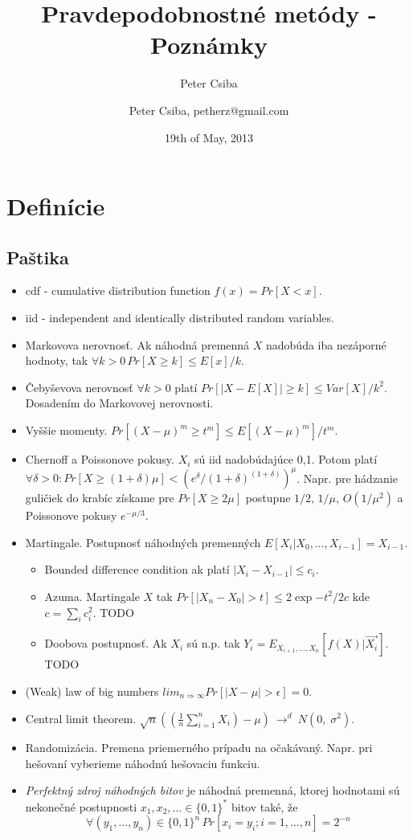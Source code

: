 \documentclass[12pt,a4paper]{article}
\author{Peter Csiba}
\title{Pravdepodobnostné metódy - Poznámky}
\date{19th of May, 2013}
\author{Peter Csiba, petherz@gmail.com}
\begin{document}
\maketitle


\section{Definície}

\subsection{Paštika} 
\begin{itemize} 
  \item cdf - cumulative distribution function $f(x) = Pr[X < x]$. 
  \item iid - independent and identically distributed random variables. 
  \item Markovova nerovnosť. Ak náhodná premenná $X$ nadobúda iba nezáporné hodnoty, tak $\forall k > 0 \, Pr[X \geq k] \leq E[x]/k$.
  \item Čebyševova nerovnosť $\forall k>0$ platí $Pr[|X-E[X]| \geq k] \leq Var[X]/k^2$. Dosadením do Markovovej nerovnosti. 
  \item Vyššie momenty. $Pr[(X-\mu)^m \geq t^m] \leq E[(X - \mu)^m]/t^m$. 
  \item Chernoff a Poissonove pokusy. $X_i$ sú iid nadobúdajúce 0,1. Potom platí $\forall \delta > 0 : Pr[X \geq (1 + \delta)\mu] < (e^\delta/(1 + \delta)^{(1+\delta)})^\mu$. Napr. pre hádzanie guličiek do krabíc získame pre $Pr[X \geq 2\mu]$ postupne $1/2$, $1/\mu$, $O(1/\mu^2)$ a Poissonove pokusy $e^{-\mu/3}$.
  \item Martingale. Postupnosť náhodných premenných $E[X_i | X_0, \ldots, X_{i-1}] = X_{i-1}$.
    \begin{itemize} 
      \item Bounded difference condition ak platí $|X_i - X_{i-1}| \leq c_i$.
      \item Azuma. Martingale $X$ tak $Pr[|X_n - X_0| > t] \leq 2 \exp{-t^2 / 2c}$ kde $c=\sum_i c_i^2$. TODO 
      \item Doobova postupnosť. Ak $X_i$ sú n.p. tak $Y_i = E_{X_{i+1}, \ldots, X_{n}}[f(X) | \overrightarrow{X_i}]$. TODO 
    \end{itemize} 
  \item (Weak) law of big numbers $lim_{n \Rightarrow \infty} Pr[|X - \mu| > \epsilon] = 0$. 
  \item Central limit theorem. $\sqrt{n}((\frac{1}{n}\sum_{i=1}^n X_i) - \mu)\ \rightarrow^d\ N(0,\;\sigma^2).$ 
  \item Randomizácia. Premena priemerného prípadu na očakávaný. Napr. pri hešovaní vyberieme náhodnú hešovaciu funkciu. 
  \item \emph{Perfektný zdroj náhodných bitov} je náhodná premenná, ktorej hodnotami sú nekonečné postupnosti $x_1, x_2, \ldots \in \{0,1\}^{*}$ bitov také, že
  $$
    \forall(y_1, \ldots, y_n) \in \{0,1\}^n \, Pr[x_i = y_i; i = 1,\ldots,n] = 2^{-n}
  $$ 
\end{itemize} 
\end{document}
